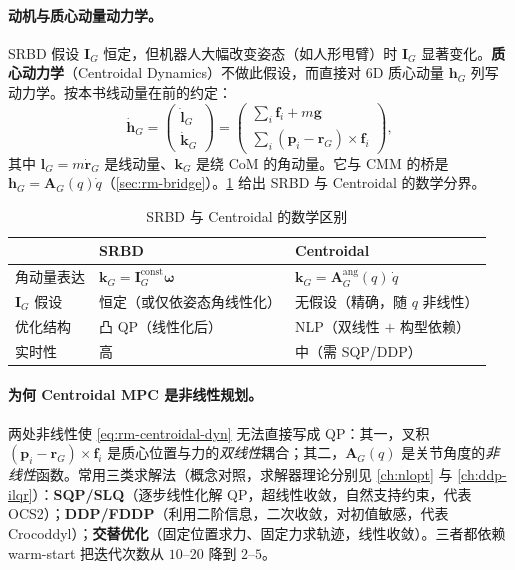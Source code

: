 \paragraph{动机与质心动量动力学。}
SRBD 假设 $\mathbf{I}_G$ 恒定，但机器人大幅改变姿态（如人形甩臂）时 $\mathbf{I}_G$ 显著变化。\textbf{质心动力学}（Centroidal Dynamics）不做此假设，而直接对 6D 质心动量 $\mathbf{h}_G$ 列写动力学。按本书线动量在前的约定：
\begin{equation}
  \dot{\mathbf{h}}_G=\begin{pmatrix}\dot{\mathbf{l}}_G\\\dot{\mathbf{k}}_G\end{pmatrix}
  =\begin{pmatrix}\sum_i\mathbf{f}_i+m\mathbf{g}\\[2pt]\sum_i(\mathbf{p}_i-\mathbf{r}_G)\times\mathbf{f}_i\end{pmatrix},
  \label{eq:rm-centroidal-dyn}
\end{equation}
其中 $\mathbf{l}_G=m\dot{\mathbf{r}}_G$ 是线动量、$\mathbf{k}_G$ 是绕 CoM 的角动量。它与 CMM 的桥是 $\mathbf{h}_G=\mathbf{A}_G(q)\dot{q}$（\cref{sec:rm-bridge}）。\cref{tab:rm-srbd-vs-cen} 给出 SRBD 与 Centroidal 的数学分界。

\begin{table}[H]\centering\small
\caption{SRBD 与 Centroidal 的数学区别}
\label{tab:rm-srbd-vs-cen}
\begin{tabular}{lll}
\toprule
 & SRBD & Centroidal \\
\midrule
角动量表达 & $\mathbf{k}_G=\mathbf{I}_G^{\mathrm{const}}\boldsymbol{\omega}$ & $\mathbf{k}_G=\mathbf{A}_G^{\mathrm{ang}}(q)\,\dot{q}$ \\
$\mathbf{I}_G$ 假设 & 恒定（或仅依姿态角线性化） & 无假设（精确，随 $q$ 非线性） \\
优化结构 & 凸 QP（线性化后） & NLP（双线性 $+$ 构型依赖） \\
实时性 & 高 & 中（需 SQP/DDP） \\
\bottomrule
\end{tabular}
\end{table}

\paragraph{为何 Centroidal MPC 是非线性规划。}
两处非线性使 \cref{eq:rm-centroidal-dyn} 无法直接写成 QP：其一，叉积 $(\mathbf{p}_i-\mathbf{r}_G)\times\mathbf{f}_i$ 是质心位置与力的\emph{双线性}耦合；其二，$\mathbf{A}_G(q)$ 是关节角度的\emph{非线性}函数。常用三类求解法（概念对照，求解器理论分别见 \cref{ch:nlopt} 与 \cref{ch:ddp-ilqr}）：\textbf{SQP/SLQ}（逐步线性化解 QP，超线性收敛，自然支持约束，代表 OCS2）；\textbf{DDP/FDDP}（利用二阶信息，二次收敛，对初值敏感，代表 Crocoddyl）；\textbf{交替优化}（固定位置求力、固定力求轨迹，线性收敛）。三者都依赖 warm-start 把迭代次数从 $10$–$20$ 降到 $2$–$5$。

